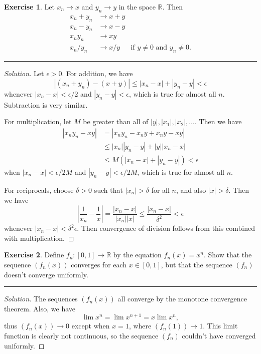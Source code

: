 \documentclass{article}
\theoremstyle{definition}
\newtheorem{exercise}{Exercise}[section]
\begin{document}
\pagebreak

\begin{exercise}
  Let $x_n \to x$ and $y_n \to y$ in the space $\mathbb{R}$. Then
  \begin{align*}
    x_n + y_n &\to x + y \\
    x_n - y_n &\to x - y \\
    x_ny_n &\to xy \\
    x_n / y_n &\to x / y & \text{if $y\ne 0$ and $y_n\ne 0$.}
  \end{align*}
\end{exercise}
\hrule
\begin{proof}[Solution]
  Let $\epsilon > 0$. For addition, we have
  $$|(x_n + y_n) - (x + y)| \le |x_n - x| + |y_n - y| < \epsilon$$
  whenever $|x_n - x| < \epsilon/2$ and $|y_n - y| < \epsilon$, which is true for almost all $n$. Subtraction is very similar.

  For multiplication, let $M$ be greater than all of $|y|,|x_1|,|x_2|,\dots$. Then we have
  \begin{align*}
    |x_ny_n - xy| &= |x_ny_n - x_ny + x_ny - xy| \\
    &\le |x_n||y_n - y| + |y||x_n - x| \\
    &\le M(|x_n - x| + |y_n - y|) < \epsilon
  \end{align*}
  when $|x_n - x| < \epsilon/2M$ and $|y_n - y| < \epsilon/2M$, which is true for almost all $n$.

  For reciprocals, choose $\delta > 0$ such that $|x_n| > \delta$ for all $n$, and also $|x| > \delta$. Then we have
  $$\left|\frac{1}{x_n} - \frac{1}{x}\right| = \frac{|x_n - x|}{|x_n||x|} \le \frac{|x_n - x|}{\delta^2} < \epsilon$$
  whenever $|x_n - x| < \delta^2 \epsilon$. Then convergence of division follows from this combined with multiplication.
\end{proof}

\pagebreak

\begin{exercise}
  Define $f_n:[0,1]\to\mathbb{R}$ by the equation $f_n(x) = x^n$. Show that the sequence $(f_n(x))$ converges for each $x\in[0,1]$, but that the sequence $(f_n)$ doesn't converge uniformly.
\end{exercise}
\hrule
\begin{proof}[Solution]
  The sequences $(f_n(x))$ all converge by the monotone convergence theorem. Also, we have
  $$\lim x^n = \lim x^{n+1} = x\lim x^n,$$
  thus $(f_n(x))\to 0$ except when $x = 1$, where $(f_n(1))\to 1$. This limit function is clearly not continuous, so the sequence $(f_n)$ couldn't have converged uniformly.
\end{proof}
\end{document}
